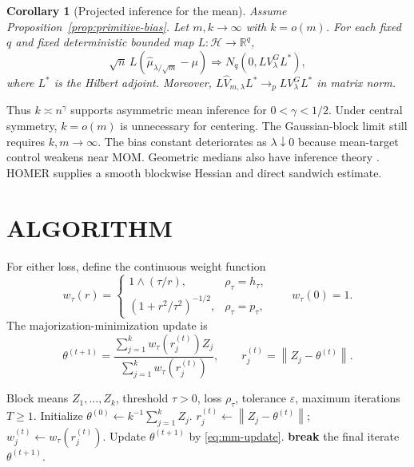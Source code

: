 \documentclass[twoside]{article}
\newtheorem{corollary}[theorem]{Corollary}
\theoremstyle{definition}
\newcommand{\Hcal}{\mathcal H}
\newcommand{\R}{\mathbb R}
\newcommand{\norm}[1]{\left\lVert #1\right\rVert}
\begin{document}
\begin{corollary}[Projected inference for the mean]\label{cor:triangular}
Assume Proposition~\ref{prop:primitive-bias}. Let $m,k\to\infty$ with $k=o(m)$. For each fixed $q$ and fixed deterministic bounded map $L:\Hcal\to\R^q$,
\[
    \sqrt n\,L(\hat\mu_{\lambda/\sqrt m}-\mu)
    \Rightarrow
    N_q\!\left(0,L V_\lambda^{G}L^*\right),
\]
where $L^*$ is the Hilbert adjoint. Moreover,
$L\hat V_{m,\lambda}L^*\to_p L V_\lambda^{G}L^*$ in matrix norm.
\end{corollary}

Thus $k\asymp n^\gamma$ supports asymmetric mean inference for $0<\gamma<1/2$. Under central symmetry, $k=o(m)$ is unnecessary for centering. The Gaussian-block limit still requires $k,m\to\infty$. The bias constant deteriorates as $\lambda\downarrow0$ because mean-target control weakens near MOM. Geometric medians also have inference theory \citep{cardot_2013_EfficientFastEstimation,cardot_2017_OnlineEstimationGeometric}. HOMER supplies a smooth blockwise Hessian and direct sandwich estimate.





\section{ALGORITHM}

For either loss, define the continuous weight function
\[
 w_\tau(r)=
 \begin{cases}
  1\wedge(\tau/r), & \rho_\tau=h_\tau,\\
  (1+r^2/\tau^2)^{-1/2}, & \rho_\tau=p_\tau,
 \end{cases}
 \qquad w_\tau(0)=1.
\]
The majorization-minimization update is
\begin{equation}\label{eq:mm-update}
    \theta^{(t+1)}=
    \frac{\sum_{j=1}^k w_\tau(r_j^{(t)})Z_j}
         {\sum_{j=1}^k w_\tau(r_j^{(t)})},
    \qquad r_j^{(t)}=\norm{Z_j-\theta^{(t)}}.
\end{equation}

\begin{algorithm}[t]
\caption{HOMER by majorization-minimization}
\label{alg:homer-mm}
\begin{algorithmic}[1]
\Require Block means $Z_1,\ldots,Z_k$, threshold $\tau>0$, loss $\rho_\tau$, tolerance $\varepsilon$, maximum iterations $T\ge1$.
\State Initialize $\theta^{(0)}\gets k^{-1}\sum_{j=1}^k Z_j$.
        \State $r_j^{(t)}\gets\norm{Z_j-\theta^{(t)}}$; $w_j^{(t)}\gets w_\tau(r_j^{(t)})$.
    \EndFor
    \State Update $\theta^{(t+1)}$ by \eqref{eq:mm-update}.
    \If{$\norm{\theta^{(t+1)}-\theta^{(t)}}\le\varepsilon\max\{1,\norm{\theta^{(t)}}\}$}
        \State \textbf{break}
    \EndIf
\EndFor
\State \Return the final iterate $\theta^{(t+1)}$.
\end{algorithmic}
\end{algorithm}
\end{document}
